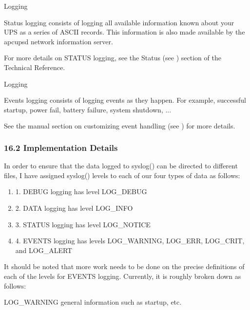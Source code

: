 {{{{{{{{{{{\smallSTATUS Logging}

Status logging consists of logging all available information known about your
UPS as a series of ASCII records. This information is also made available by
the apcupsd network information server.  

For more details on STATUS logging, see the Status (see 
) section of
the Technical Reference. 

{\smallEVENTS Logging}

Events logging consists of logging events as they happen. For example,
successful startup, power fail, battery failure, system shutdown, ...  

See the manual section on customizing event handling (see 
) for
more details. 

\label{Implementation-Details}

\subsubsection*{16.2 Implementation Details}

In order to ensure that the data logged to syslog() can be directed to
different files, I have assigned syslog() levels to each of our four types of
data as follows:  

\begin{enumerate}
\item 1. DEBUG logging has level LOG\_DEBUG  
\item 2. DATA logging has level LOG\_INFO  
\item 3. STATUS logging has level LOG\_NOTICE  
\item 4. EVENTS logging has levels LOG\_WARNING, LOG\_ERR, LOG\_CRIT, and
LOG\_ALERT  
\end{enumerate}

It should be noted that more work needs to be done on the precise definitions
of each of the levels for EVENTS logging. Currently, it is roughly broken down
as follows:  

LOG\_WARNING general information such as startup, etc.  

}}}}}}}}}}
